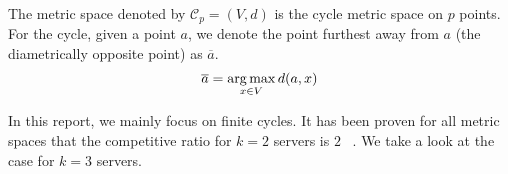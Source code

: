 The metric space denoted by $\mathcal{C}_p = (V,d)$ is the cycle metric space on $p$ points. \\

For the cycle, given a point $a$, we denote the point furthest away from $a$ (the diametrically opposite point) as $\overline{a}$. $$\overline{a} = \operatorname*{arg\,max}_{x\in V} d(a,x)$$

In this report, we mainly focus on finite cycles. It has been proven for all metric spaces that the competitive ratio for $k=2$ servers is $2$ ~\cite{MMS88}. We take a look at the case for $k=3$ servers.

